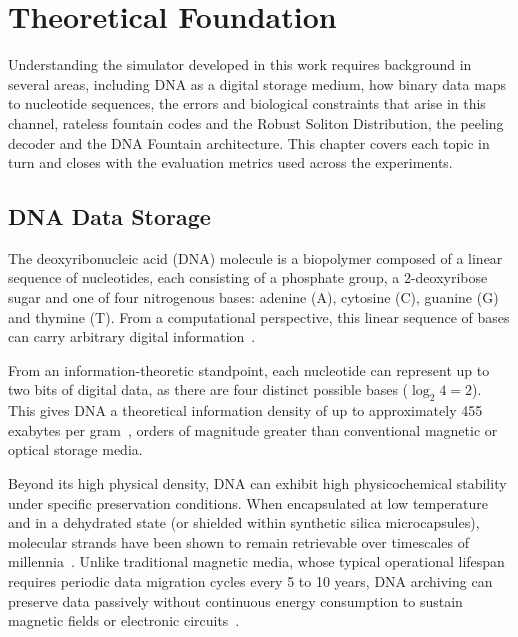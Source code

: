 \chapter{Theoretical Foundation}
\label{chap:theoretical_foundation}

Understanding the simulator developed in this work requires background in several areas, including DNA as a digital storage medium, how binary data maps to nucleotide sequences, the errors and biological constraints that arise in this channel, rateless fountain codes and the Robust Soliton Distribution, the peeling decoder and the DNA Fountain architecture. This chapter covers each topic in turn and closes with the evaluation metrics used across the experiments.

\section{DNA Data Storage}
\label{sec:dna_data_storage}

The deoxyribonucleic acid (DNA) molecule is a biopolymer composed of a linear sequence of nucleotides, each consisting of a phosphate group, a 2-deoxyribose sugar and one of four nitrogenous bases: adenine (A), cytosine (C), guanine (G) and thymine (T). From a computational perspective, this linear sequence of bases can carry arbitrary digital information~\cite{compeau2018}.

From an information-theoretic standpoint, each nucleotide can represent up to two bits of digital data, as there are four distinct possible bases ($\log_2 4 = 2$). This gives DNA a theoretical information density of up to approximately 455 exabytes per gram~\cite{church2012}, orders of magnitude greater than conventional magnetic or optical storage media.

Beyond its high physical density, DNA can exhibit high physicochemical stability under specific preservation conditions. When encapsulated at low temperature and in a dehydrated state (or shielded within synthetic silica microcapsules), molecular strands have been shown to remain retrievable over timescales of millennia~\cite{grass2015}. Unlike traditional magnetic media, whose typical operational lifespan requires periodic data migration cycles every 5 to 10 years, DNA archiving can preserve data passively without continuous energy consumption to sustain magnetic fields or electronic circuits~\cite{ceze2019}.

